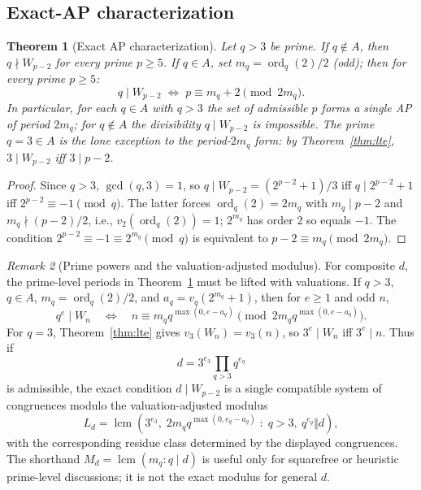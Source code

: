 \documentclass[11pt]{amsart}
\theoremstyle{plain}
\newtheorem{theorem}{Theorem}[section]
\theoremstyle{definition}
\theoremstyle{remark}
\newtheorem{remark}[theorem]{Remark}
\numberwithin{equation}{section}
\newcommand{\ord}{\operatorname{ord}}
\begin{document}
\subsection{Exact-AP characterization}

\begin{theorem}[Exact AP characterization]\label{thm:exact-ap}
Let $q>3$ be prime. If $q\notin A$, then $q\nmid W_{p-2}$ for every prime $p\geq5$. If $q\in A$, set $m_q=\ord_q(2)/2$ (odd); then for every prime $p\geq5$:
\[
  q \mid W_{p-2} \;\Longleftrightarrow\; p \equiv m_q + 2 \pmod{2 m_q}.
\]
In particular, for each $q \in A$ with $q > 3$ the set of admissible $p$ forms a single AP of period $2 m_q$; for $q \notin A$ the divisibility $q \mid W_{p-2}$ is impossible. The prime $q = 3 \in A$ is the lone exception to the period-$2 m_q$ form: by Theorem~\ref{thm:lte}, $3 \mid W_{p-2}$ iff $3 \mid p - 2$.
\end{theorem}

\begin{proof}
Since $q > 3$, $\gcd(q, 3) = 1$, so $q \mid W_{p-2} = (2^{p-2}+1)/3$ iff $q \mid 2^{p-2} + 1$ iff $2^{p-2} \equiv -1 \pmod q$. The latter forces $\ord_q(2) = 2 m_q$ with $m_q \mid p - 2$ and $m_q \nmid (p - 2)/2$, i.e., $v_2(\ord_q(2)) = 1$; $2^{m_q}$ has order 2 so equals $-1$. The condition $2^{p-2} \equiv -1 \equiv 2^{m_q} \pmod q$ is equivalent to $p - 2 \equiv m_q \pmod{2 m_q}$.
\end{proof}

\begin{remark}[Prime powers and the valuation-adjusted modulus]\label{rem:valuation-adjusted-Ld}
For composite $d$, the prime-level periods in Theorem~\ref{thm:exact-ap} must be lifted with valuations. If $q>3$, $q\in A$, $m_q=\ord_q(2)/2$, and $a_q=v_q(2^{m_q}+1)$, then for $e\geq1$ and odd $n$,
\[
  q^e \mid W_n
  \quad\Longleftrightarrow\quad
  n \equiv m_q q^{\max(0,e-a_q)}
  \pmod{2m_q q^{\max(0,e-a_q)}}.
\]
For $q=3$, Theorem~\ref{thm:lte} gives $v_3(W_n)=v_3(n)$, so $3^e\mid W_n$ iff $3^e\mid n$. Thus if
\[
  d=3^{e_3}\prod_{q>3}q^{e_q}
\]
is admissible, the exact condition $d\mid W_{p-2}$ is a single compatible system of congruences modulo the valuation-adjusted modulus
\[
  L_d=\operatorname{lcm}\!\left(
    3^{e_3},
    \;2m_q q^{\max(0,e_q-a_q)} \;:\; q>3,\ q^{e_q}\Vert d
  \right),
\]
with the corresponding residue class determined by the displayed congruences. The shorthand $M_d=\operatorname{lcm}(m_q:q\mid d)$ is useful only for squarefree or heuristic prime-level discussions; it is not the exact modulus for general $d$.
\end{remark}
\end{document}
